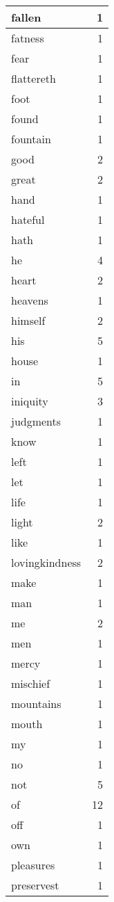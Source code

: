 \begin{center}
\begin{longtable}{l|r}
fallen & 1 \\ \hline
fatness & 1 \\ \hline
fear & 1 \\ \hline
flattereth & 1 \\ \hline
foot & 1 \\ \hline
found & 1 \\ \hline
fountain & 1 \\ \hline
good & 2 \\ \hline
great & 2 \\ \hline
hand & 1 \\ \hline
hateful & 1 \\ \hline
hath & 1 \\ \hline
he & 4 \\ \hline
heart & 2 \\ \hline
heavens & 1 \\ \hline
himself & 2 \\ \hline
his & 5 \\ \hline
house & 1 \\ \hline
in & 5 \\ \hline
iniquity & 3 \\ \hline
judgments & 1 \\ \hline
know & 1 \\ \hline
left & 1 \\ \hline
let & 1 \\ \hline
life & 1 \\ \hline
light & 2 \\ \hline
like & 1 \\ \hline
lovingkindness & 2 \\ \hline
make & 1 \\ \hline
man & 1 \\ \hline
me & 2 \\ \hline
men & 1 \\ \hline
mercy & 1 \\ \hline
mischief & 1 \\ \hline
mountains & 1 \\ \hline
mouth & 1 \\ \hline
my & 1 \\ \hline
no & 1 \\ \hline
not & 5 \\ \hline
of & 12 \\ \hline
off & 1 \\ \hline
own & 1 \\ \hline
pleasures & 1 \\ \hline
preservest & 1 \\ \hline

\end{longtable}
\end{center}
